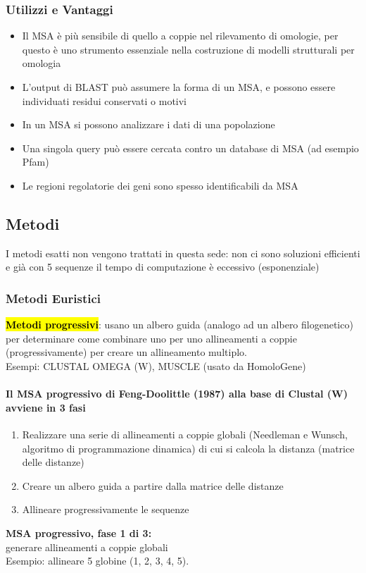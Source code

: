 \documentclass{article}
\begin{document}
\subsubsection{Utilizzi e Vantaggi}
    \begin{itemize}
        \item Il MSA è più sensibile di quello a coppie nel rilevamento di omologie, per questo è uno strumento essenziale nella costruzione di modelli strutturali per omologia
        \item L'output di BLAST può assumere la forma di un MSA, e possono essere individuati residui conservati o motivi
        \item In un MSA si possono analizzare i dati di una popolazione
        \item Una singola query può essere cercata contro un database di MSA (ad esempio Pfam)
        \item Le regioni regolatorie dei geni sono spesso identificabili da MSA
    \end{itemize}
\subsection{Metodi}
I metodi esatti non vengono trattati in questa sede: non ci sono soluzioni efficienti e già con 5 sequenze il tempo di computazione è eccessivo (esponenziale)
\subsubsection{Metodi Euristici}
\hl{\textbf{Metodi progressivi}}: usano un albero guida (analogo ad un albero filogenetico) per determinare come combinare uno per uno allineamenti a coppie
(progressivamente) per creare un allineamento multiplo.\\
\small{Esempi: CLUSTAL OMEGA (W), MUSCLE (usato da HomoloGene)}
\paragraph{Il MSA progressivo di Feng-Doolittle (1987) alla base di Clustal (W) avviene in 3 fasi}
\begin{enumerate}
    \item Realizzare una serie di allineamenti a coppie globali (Needleman e Wunsch, algoritmo di programmazione dinamica) di cui si calcola la distanza (matrice delle distanze)
    \item Creare un albero guida a partire dalla matrice delle distanze
    \item Allineare progressivamente le sequenze
\end{enumerate}
\textbf{MSA progressivo, fase 1 di 3:}\\
\normalsize{generare allineamenti a coppie globali}\\
\small{Esempio: allineare 5 globine (1, 2, 3, 4, 5).}\\
\end{document}
